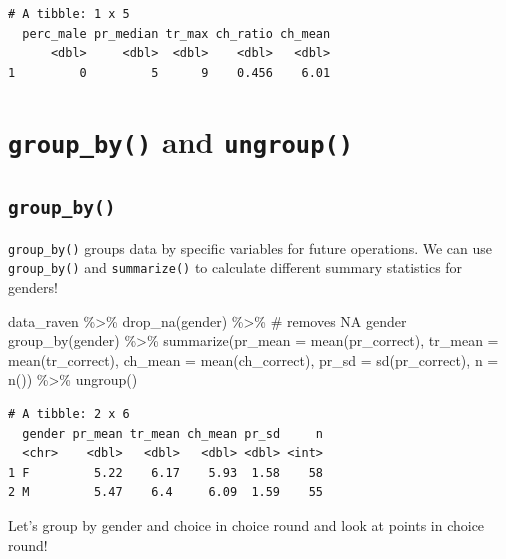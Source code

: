 \documentclass[
  letterpaper,
]{book}
\newenvironment{Shaded}{\begin{snugshade}}{\end{snugshade}}
\newcommand{\AttributeTok}[1]{\textcolor[rgb]{0.40,0.45,0.13}{#1}}
\newcommand{\CommentTok}[1]{\textcolor[rgb]{0.37,0.37,0.37}{#1}}
\newcommand{\FunctionTok}[1]{\textcolor[rgb]{0.28,0.35,0.67}{#1}}
\newcommand{\NormalTok}[1]{\textcolor[rgb]{0.00,0.23,0.31}{#1}}
\newcommand{\SpecialCharTok}[1]{\textcolor[rgb]{0.37,0.37,0.37}{#1}}
\begin{document}
\begin{verbatim}
# A tibble: 1 x 5
  perc_male pr_median tr_max ch_ratio ch_mean
      <dbl>     <dbl>  <dbl>    <dbl>   <dbl>
1         0         5      9    0.456    6.01
\end{verbatim}

\hypertarget{group_by-and-ungroup}{%
\section{\texorpdfstring{\texttt{group\_by()} and
\texttt{ungroup()}}{group\_by() and ungroup()}}\label{group_by-and-ungroup}}

\hypertarget{group_by}{%
\subsection{\texorpdfstring{\texttt{group\_by()}}{group\_by()}}\label{group_by}}

\texttt{group\_by()} groups data by specific variables for future
operations. We can use \texttt{group\_by()} and \texttt{summarize()} to
calculate different summary statistics for genders!

\begin{Shaded}
\begin{Highlighting}[]
\NormalTok{data\_raven }\SpecialCharTok{\%\textgreater{}\%} 
  \FunctionTok{drop\_na}\NormalTok{(gender) }\SpecialCharTok{\%\textgreater{}\%}  \CommentTok{\# removes NA gender}
  \FunctionTok{group\_by}\NormalTok{(gender) }\SpecialCharTok{\%\textgreater{}\%} 
  \FunctionTok{summarize}\NormalTok{(}\AttributeTok{pr\_mean =} \FunctionTok{mean}\NormalTok{(pr\_correct),}
            \AttributeTok{tr\_mean =} \FunctionTok{mean}\NormalTok{(tr\_correct),}
            \AttributeTok{ch\_mean =} \FunctionTok{mean}\NormalTok{(ch\_correct),}
            \AttributeTok{pr\_sd =} \FunctionTok{sd}\NormalTok{(pr\_correct),}
            \AttributeTok{n =} \FunctionTok{n}\NormalTok{()) }\SpecialCharTok{\%\textgreater{}\%}
  \FunctionTok{ungroup}\NormalTok{()}
\end{Highlighting}
\end{Shaded}

\begin{verbatim}
# A tibble: 2 x 6
  gender pr_mean tr_mean ch_mean pr_sd     n
  <chr>    <dbl>   <dbl>   <dbl> <dbl> <int>
1 F         5.22    6.17    5.93  1.58    58
2 M         5.47    6.4     6.09  1.59    55
\end{verbatim}

Let's group by gender and choice in choice round and look at points in
choice round!
\end{document}
